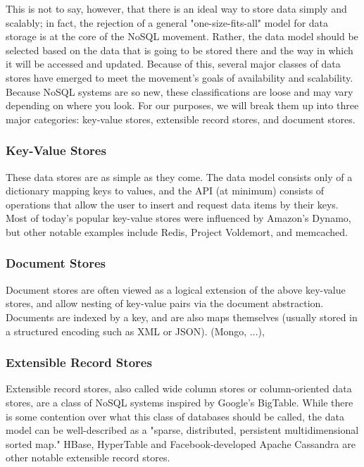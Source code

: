 \documentclass[11pt,a4paper]{report}
\begin{document}
This is not to say, however, that there is an ideal way to store data simply and scalably; in fact, the rejection of a general "one-size-fits-all" model for data storage is at the core of the NoSQL movement. Rather, the data model should be selected based on the data that is going to be stored there and the way in which it will be accessed and updated. Because of this, several major classes of data stores have emerged to meet the movement's goals of availability and scalability. Because NoSQL systems are so new, these classifications are loose and may vary depending on where you look. For our purposes, we will break them up into three major categories: key-value stores, extensible record stores, and document stores.

\subsubsection{Key-Value Stores}
These data stores are as simple as they come. The data model consists only of a dictionary mapping keys to values, and the API (at minimum) consists of operations that allow the user to insert and request data items by their keys.\cite{strauch2011nosql} Most of today's popular key-value stores were influenced by Amazon's Dynamo, but other notable examples include Redis, Project Voldemort, and memcached.
 
 
\subsubsection{Document Stores}
Document stores are often viewed as a logical extension of the above key-value stores, and allow nesting of key-value pairs via the document abstraction. Documents are indexed by a key, and are also maps themselves (usually stored in a structured encoding such as XML or JSON). (Mongo, ...),


 
\subsubsection{Extensible Record Stores}
Extensible record stores, also called wide column stores or column-oriented data stores, are a class of NoSQL systems inspired by Google's BigTable. While there is some contention over what this class of databases should be called, the data model can be well-described as a "sparse, distributed, persistent multidimensional sorted map."\cite{chang2008bigtable} HBase, HyperTable and Facebook-developed Apache Cassandra are other notable extensible record stores.
\end{document}
